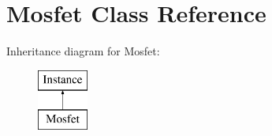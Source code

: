 \hypertarget{class_s_p_i_c_e_1_1_mosfet}{}\section{Mosfet Class Reference}
\label{class_s_p_i_c_e_1_1_mosfet}
Inheritance diagram for Mosfet\+:\begin{figure}[H]
\begin{center}
\leavevmode
\includegraphics[height=2.000000cm]{class_s_p_i_c_e_1_1_mosfet}
\end{center}
\end{figure}
